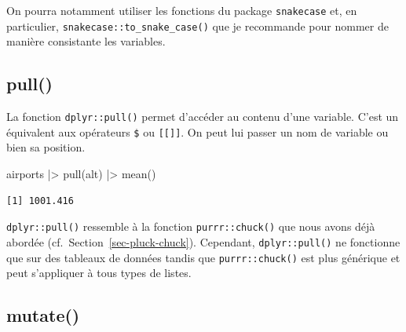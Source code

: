 \documentclass[
  letterpaper,
  DIV=11,
  numbers=noendperiod,
  oneside]{scrreprt}
\newenvironment{Shaded}{\begin{snugshade}}{\end{snugshade}}
\newcommand{\FunctionTok}[1]{\textcolor[rgb]{0.28,0.35,0.67}{#1}}
\newcommand{\NormalTok}[1]{\textcolor[rgb]{0.00,0.23,0.31}{#1}}
\newcommand{\SpecialCharTok}[1]{\textcolor[rgb]{0.37,0.37,0.37}{#1}}
\begin{document}
On pourra notamment utiliser les fonctions du package \texttt{snakecase}
et, en particulier, \texttt{snakecase::to\_snake\_case()} que je
recommande pour nommer de manière consistante les variables.

\hypertarget{pull}{%
\subsection{pull()}\label{pull}}

La fonction \texttt{dplyr::pull()} permet d'accéder au contenu d'une
variable. C'est un équivalent aux opérateurs \texttt{\$} ou
\texttt{{[}{[}{]}{]}}. On peut lui passer un nom de variable ou bien sa
position.

\begin{Shaded}
\begin{Highlighting}[]
\NormalTok{airports }\SpecialCharTok{|\textgreater{}} 
  \FunctionTok{pull}\NormalTok{(alt) }\SpecialCharTok{|\textgreater{}} 
  \FunctionTok{mean}\NormalTok{()}
\end{Highlighting}
\end{Shaded}

\begin{verbatim}
[1] 1001.416
\end{verbatim}

\begin{tcolorbox}[enhanced jigsaw, colbacktitle=quarto-callout-note-color!10!white, opacityback=0, toprule=.15mm, colback=white, coltitle=black, bottomtitle=1mm, toptitle=1mm, titlerule=0mm, rightrule=.15mm, title=\textcolor{quarto-callout-note-color}{\faInfo}\hspace{0.5em}{Note}, breakable, bottomrule=.15mm, opacitybacktitle=0.6, arc=.35mm, left=2mm, leftrule=.75mm, colframe=quarto-callout-note-color-frame]

\texttt{dplyr::pull()} ressemble à la fonction \texttt{purrr::chuck()}
que nous avons déjà abordée (cf.~Section~\ref{sec-pluck-chuck}).
Cependant, \texttt{dplyr::pull()} ne fonctionne que sur des tableaux de
données tandis que \texttt{purrr::chuck()} est plus générique et peut
s'appliquer à tous types de listes.

\end{tcolorbox}

\hypertarget{mutate}{%
\subsection{mutate()}\label{mutate}}
\end{document}
